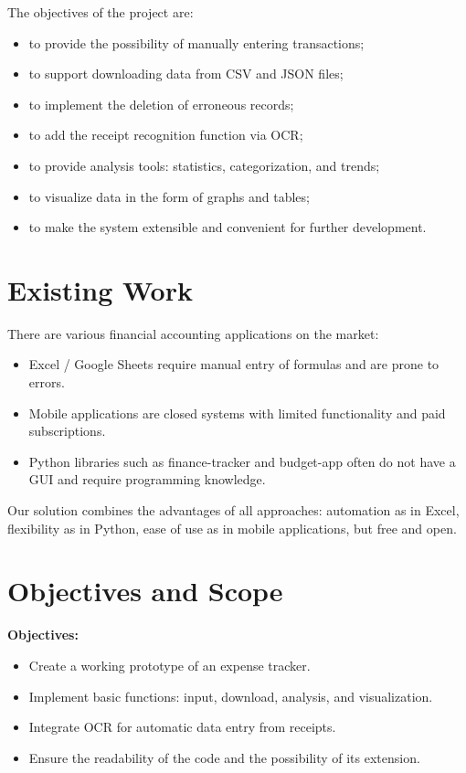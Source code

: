 \documentclass[conference]{IEEEtran}
\begin{document}
The objectives of the project are:
\begin{itemize}
\item to provide the possibility of manually entering transactions;
\item to support downloading data from CSV and JSON files;
\item to implement the deletion of erroneous records;
\item to add the receipt recognition function via OCR;
\item to provide analysis tools: statistics, categorization, and trends;
\item to visualize data in the form of graphs and tables;
\item to make the system extensible and convenient for further development.
\end{itemize}

\section{Existing Work}
There are various financial accounting applications on the market:
\begin{itemize}
\item Excel / Google Sheets require manual entry of formulas and are prone to errors.
\item Mobile applications are closed systems with limited functionality and paid subscriptions.
\item Python libraries such as finance-tracker and budget-app often do not have a GUI and require programming knowledge.
\end{itemize}

Our solution combines the advantages of all approaches: automation as in Excel, flexibility as in Python, ease of use as in mobile applications, but free and open.

\section{Objectives and Scope}
\textbf{Objectives:}
\begin{itemize}
\item Create a working prototype of an expense tracker.
\item Implement basic functions: input, download, analysis, and visualization.
\item Integrate OCR for automatic data entry from receipts.
\item Ensure the readability of the code and the possibility of its extension.
\end{itemize}
\end{document}
